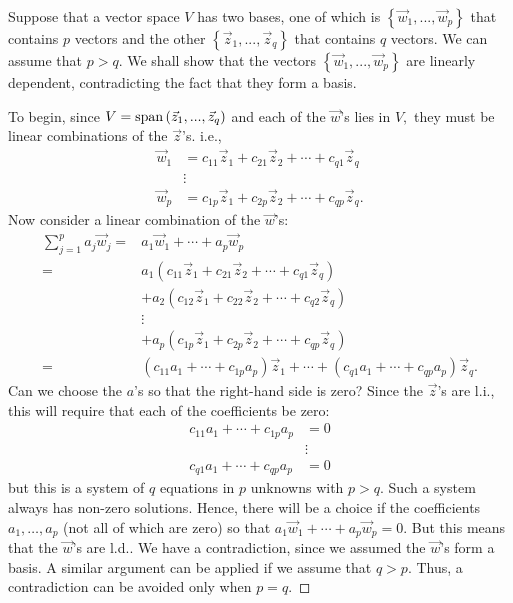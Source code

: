 \documentclass[
  letterpaper,
  DIV=11,
  numbers=noendperiod]{scrartcl}
\theoremstyle{remark}
\newenvironment{fbx}[3]{\begin{tcolorbox}[enhanced, breakable,%
attach boxed title to top*={xshift=1.4pt},
boxed title style={boxrule=0.0mm, fuzzy shadow={1pt}{-1pt}{0mm}{0.1mm}{gray}, arc=.3em, rounded corners=east, sharp corners=west}, colframe=#1-color2, colbacktitle=#1-color1, colback = white, coltitle=black,  titlerule=0mm, toprule=0pt, bottomrule=.7pt, leftrule=.3em, rightrule=0pt, outer arc=.3em,  arc=0pt,	 sharp corners = east, left=.5em, bottomtitle=1mm, toptitle=1mm,title=\textbf{#2}\hspace{0.5em}{#3}]}
{\end{tcolorbox}}
\begin{document}
\label{Proofux2a-2}
\begin{fbx}{Proof}{Proof}{}
\label{Proof*-2}
Suppose that a vector space \(V\) has two bases, one of which is
\(\left\{ {\vec w}_{1},...,{\vec w}_{p}\right\}\) that contains \(p\)
vectors and the other \(\left\{ {\vec z}_{1},...,{\vec z}_{q}\right\}\)
that contains \(q\) vectors. We can assume that \(p>q.\) We shall show
that the vectors \(\left\{ {\vec w}_{1},...,{\vec w}_{p}\right\}\) are
linearly dependent, contradicting the fact that they form a basis.

To begin, since
\(V={\rm span}\left( {\vec z}_{1},...,{\vec z}_{q}\right)\) and each of
the \({\vec w}\)'s lies in \(V,\) they must be linear combinations of
the \({\vec z}\)'s. i.e., \[\begin{aligned}
{\vec w}_{1} &=c_{11}{\vec z}_{1}+c_{21}{\vec z}_{2}+\cdots +c_{q1}
{\vec z}_{q} \\
&\vdots \\
{\vec w}_{p} &=c_{1p}{\vec z}_{1}+c_{2p}{\vec z}_{2}+\cdots +c_{qp}
{\vec z}_{q}.
\end{aligned}\] Now consider a linear combination of the \({\vec w}\)'s:
\[\begin{aligned}
\sum_{j=1}^{p}a_{j}{\vec w}_{j}  = & a_{1}{\vec w}_{1}+\cdots +a_{p}
{\vec w}_{p} \\
= & a_{1}\left( c_{11}{\vec z}_{1}+c_{21}{\vec z}_{2}+\cdots +c_{q1}
{\vec z}_{q}\right) \\
&+ a_{2} \left( c_{12}{\vec z}_{1}+c_{22}{\vec z}_{2}+\cdots +c_{q2}
{\vec z}_{q}\right) \\
& \vdots \\
& + a_{p}\left( c_{1p}{\vec z}_{1}+c_{2p}{\vec z}_{2}+\cdots +c_{qp}
{\vec z}_{q}\right) \\
= & 
\left( c_{11}a_{1}+\cdots +c_{1p}a_{p}\right) {\vec z}_{1}+\cdots
+\left( c_{q1}a_{1}+\cdots +c_{qp}a_{p}\right) {\vec z}_{q}.
\end{aligned}\] Can we choose the \(a\)'s so that the right-hand side is
zero? Since the \({\vec z}\)'s are l.i., this will require that each of
the coefficients be zero: \[\begin{aligned}
c_{11}a_{1}+\cdots +c_{1p}a_{p} &=0 \\
&\vdots \\
c_{q1}a_{1}+\cdots +c_{qp}a_{p} &=0
\end{aligned}\] but this is a system of \(q\) equations in \(p\)
unknowns with \(p>q.\) Such a system always has non-zero solutions.
Hence, there will be a choice if the coefficients
\(a_{1},\ldots ,a_{p}\) (not all of which are zero) so that \(a_{1}
{\vec w}_{1}+\cdots +a_{p}{\vec w}_{p}=0.\) But this means that the
\({\vec w}\)'s are l.d.. We have a contradiction, since we assumed the
\({\vec w}\)'s form a basis. A similar argument can be applied if we
assume that \(q>p.\) Thus, a contradiction can be avoided only when
\(p=q.\)~◻

\end{fbx}
\end{document}
